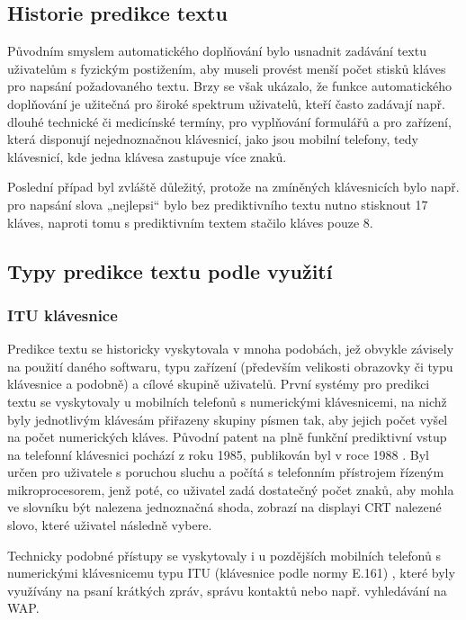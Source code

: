 \documentclass[a4paper,11pt]{article}
\begin{document}
\subsection{Historie predikce textu}

Původním smyslem automatického doplňování bylo usnadnit zadávání textu uživatelům s fyzickým postižením, aby museli provést menší počet stisků kláves pro napsání požadovaného textu. Brzy se však ukázalo, že funkce automatického doplňování je užitečná pro široké spektrum uživatelů, kteří často zadávají např. dlouhé technické či medicínské termíny, pro vyplňování formulářů a pro zařízení, která disponují nejednoznačnou klávesnicí, jako jsou mobilní telefony, tedy klávesnicí, kde jedna klávesa zastupuje více znaků. 

Poslední případ byl zvláště důležitý, protože na zmíněných klávesnicích bylo např. pro napsání slova „nejlepsi“ bylo bez prediktivního textu nutno stisknout 17 kláves, naproti tomu s prediktivním textem stačilo kláves pouze 8. \cite{dXVv6nPb2KifFXYv}

\subsection{Typy predikce textu podle využití}

\subsubsection{ITU klávesnice}

Predikce textu se historicky vyskytovala v mnoha podobách, jež obvykle závisely na použití daného softwaru, typu zařízení (především velikosti obrazovky či typu klávesnice a podobně) a cílové skupině uživatelů. První systémy pro predikci textu se vyskytovaly u mobilních telefonů s numerickými klávesnicemi, na nichž byly jednotlivým klávesám přiřazeny skupiny písmen tak, aby jejich počet vyšel na počet numerických kláves. Původní patent na plně funkční prediktivní vstup na telefonní klávesnici pochází z roku 1985, publikován byl v roce 1988 \cite{Feinson1988}. Byl určen pro uživatele s poruchou sluchu a počítá s telefonním přístrojem řízeným mikroprocesorem, jenž poté, co uživatel zadá dostatečný počet znaků, aby mohla ve slovníku být nalezena jednoznačná shoda, zobrazí na displayi CRT nalezené slovo, které uživatel následně vybere.

Technicky podobné přístupy se vyskytovaly i u pozdějších mobilních telefonů s numerickými klávesnicemu typu ITU (klávesnice podle normy E.161) \cite{mfmtlqoxL48pMk3T}, které byly využívány na psaní krátkých zpráv, správu kontaktů nebo např. vyhledávání na WAP. 
\end{document}
